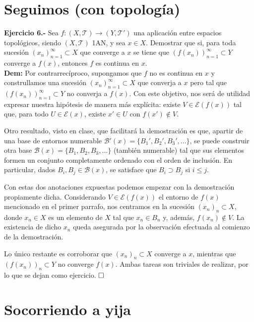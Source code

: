 \documentclass{article}
\begin{document}
\newpage

\section{Seguimos (con topología)}

\textbf{Ejercicio 6.-} Sea $f : (X, \mathcal{T}) \longrightarrow (Y, \mathcal{T}')$ una aplicación entre espacios topológicos, siendo $(X, \mathcal{T})$ 1AN, y sea $x \in X$. Demostrar que si, para toda sucesión $(x_n)_{n=1}^{\infty} \subset X$ que converge a $x$ se tiene que $(f(x_n))_{n=1}^{\infty} \subset Y$ converge a $f(x)$, entonces $f$ es continua en $x$. \\

\noindent\textbf{Dem:} Por contrarrecíproco, supongamos que $f$ no es continua en $x$ y construllamos una sucesión $(x_n)_{n=1}^{\infty} \subset X$ que converja a $x$ pero tal que $(f(x_n))_{n=1}^{\infty} \subset Y$ no converja a $f(x)$. Con este objetivo, nos será de utilidad expresar nuestra hipótesis de manera más explícita: existe $V \in \mathcal{E}(f(x))$ tal que, para todo $U \in \mathcal{E}(x)$, existe $x' \in U$ con $f(x') \notin V$.

Otro resultado, visto en clase, que facilitará la demostración es que, apartir de una base de entornos numerable $\mathcal{B}'(x) = \{B_1', B_2', B_3', ...\}$, se puede construir otra base $\mathcal{B}(x) = \{B_1, B_2, B_3, ...\}$ (también numerable) tal que sus elementos formen un conjunto completamente ordenado con el orden de inclusión. En particular, dados $B_i, B_j \in \mathcal{B}(x)$, se satisface que $B_i \supset B_j$ si $i \leq j$.

Con estas dos anotaciones expuestas podemos empezar con la demostración propiamente dicha. Considerando $V \in \mathcal{E}(f(x))$ el entorno de $f(x)$ mencionado en el primer parrafo, nos centramos en la sucesión $(x_n)_n \subset X$, donde $x_n \in X$ es un elemento de $X$ tal que $x_n \in B_n$ y, además, $f(x_n) \notin V$. La existencia de dicho $x_n$ queda asegurada por la observación efectuada al comienzo de la demostración.

Lo único restante es corroborar que $(x_n)_n \subset X$ converge a $x$, mientras que $(f(x_n))_n \subset Y$ no converge $f(x)$. Ambas tareas son triviales de realizar, por lo que se dejan como ejercicio. $\hfill\square$

\newpage

\section{Socorriendo a yija}
\end{document}
